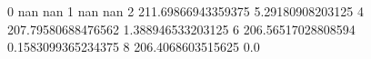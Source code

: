 0 nan nan
1 nan nan
2 211.69866943359375 5.29180908203125
4 207.79580688476562 1.388946533203125
6 206.56517028808594 0.1583099365234375
8 206.4068603515625 0.0
